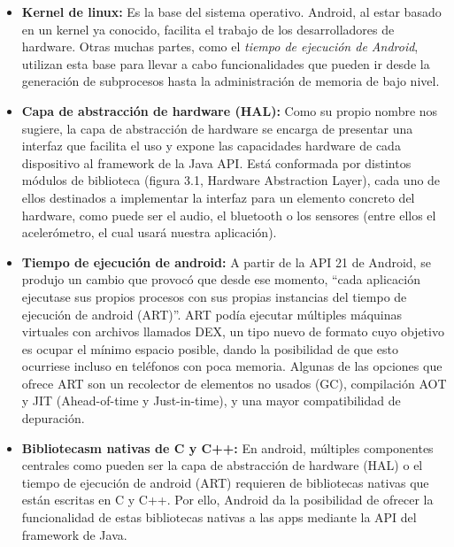\begin{itemize}

    \item \textbf{Kernel de linux:} Es la base del sistema operativo. Android, al estar basado en un kernel ya conocido, facilita el trabajo de los desarrolladores de hardware. Otras muchas partes, como el \textit{tiempo de ejecución de Android}, utilizan esta base para llevar a cabo funcionalidades que pueden ir desde la generación de subprocesos hasta la administración de memoria de bajo nivel. 
    
    \item \textbf{Capa de abstracción de hardware (HAL):} Como su propio nombre nos sugiere, la capa de abstracción de hardware se encarga de presentar una interfaz que facilita el uso y expone las capacidades hardware de cada dispositivo al framework de la Java API. Está conformada por distintos módulos de biblioteca (figura 3.1, Hardware Abstraction Layer), cada uno de ellos destinados a implementar la interfaz para un elemento concreto del hardware, como puede ser el audio, el bluetooth o los sensores (entre ellos el acelerómetro, el cual usará nuestra aplicación).
    
    \newpage
    
    \item \textbf{Tiempo de ejecución de android:} A partir de la API 21 de Android, se produjo un cambio que provocó que desde ese momento, ``cada aplicación ejecutase sus propios procesos con sus propias instancias del tiempo de ejecución de android (ART)''\cite{arquitecturaAndroid}. ART podía ejecutar múltiples máquinas virtuales con archivos llamados DEX, un tipo nuevo de formato cuyo objetivo es ocupar el mínimo espacio posible, dando la posibilidad de que esto ocurriese incluso en teléfonos con poca memoria. Algunas de las opciones que ofrece ART son un recolector de elementos no usados (GC), compilación AOT y JIT (Ahead-of-time y Just-in-time), y una mayor compatibilidad de depuración.
    
    \item \textbf{Bibliotecasm nativas de C y C++:} En android, múltiples componentes centrales como pueden ser la capa de abstracción de hardware (HAL) o el tiempo de ejecución de android (ART) requieren de bibliotecas nativas que están escritas en C y C++. Por ello, Android da la posibilidad de ofrecer la funcionalidad de estas bibliotecas nativas a las apps mediante la API del framework de Java.
    

\end{itemize}

